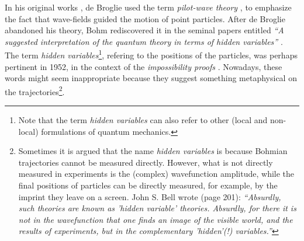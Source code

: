 \documentclass[onecolumn,nofootinbib, secnumarabic, amsmath, nobibnotes,11pt,aps,pra]{revtex4-1}
\begin{document}
In his original works \cite{om.dB_AnnPhys,om.debroglie1927b}, de Broglie used the term \emph{pilot-wave theory} \cite{om.Valentini2006}, to emphasize the fact that wave-fields guided the motion of point particles.
After de Broglie abandoned his theory, Bohm rediscovered it in the seminal papers entitled \emph{``A suggested interpretation of the quantum theory in terms of hidden variables''} \cite{om.bohm1952a,om.bohm1952b}.
The term \emph{hidden variables}\footnote{Note that the term \emph{hidden variables} can also refer to other (local and non-local) formulations of quantum mechanics.}, refering to the  positions of the particles, was perhaps pertinent in 1952, in the context of the \emph{impossibility proofs} \cite{om.impossibility_proofs}.
Nowadays, these words might seem inappropriate because they suggest something metaphysical on the trajectories\footnote{Sometimes it is argued that the name \emph{hidden variables} is because Bohmian trajectories cannot be measured directly. However, what is not directly measured in experiments is the (complex) wavefunction amplitude, while the final positions of particles can be directly measured, for example, by the imprint they leave on a screen. John S. Bell wrote \cite{om.Bell1987} (page 201): \emph{``Absurdly, such theories are known as 'hidden variable' theories. Absurdly, for there it is not in the wavefunction that one finds an image of the visible world, and the results of experiments, but in the complementary 'hidden'(!) variables.''}}.
\end{document}
